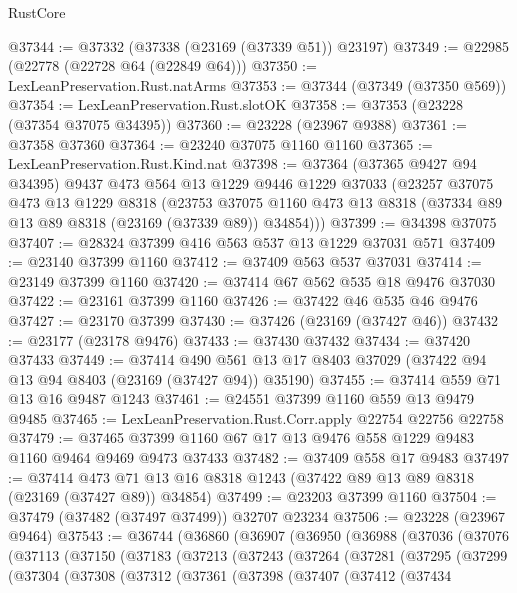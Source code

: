 \begin{lexlean}{RustCore}
\begin{coremodule}
@37344 := @37332 (@37338 (@23169 (@37339 @51)) @23197)
@37349 := @22985 (@22778 (@22728 @64 (@22849 @64)))
@37350 := LexLeanPreservation.Rust.natArms
@37353 := @37344 (@37349 (@37350 @569))
@37354 := LexLeanPreservation.Rust.slotOK
@37358 := @37353 (@23228 (@37354 @37075 @34395))
@37360 := @23228 (@23967 @9388)
@37361 := @37358 @37360
@37364 := @23240 @37075 @1160 @1160
@37365 := LexLeanPreservation.Rust.Kind.nat
@37398 := @37364
    (@37365 @9427 @94 @34395)
    @9437
    @473
    @564
    @13
    @1229
    @9446
    @1229
    @37033
    (@23257
      @37075
      @473
      @13
      @1229
      @8318
      (@23753 @37075 @1160 @473 @13 @8318 (@37334 @89 @13 @89 @8318 (@23169 (@37339 @89)) @34854)))
@37399 := @34398 @37075
@37407 := @28324 @37399 @416 @563 @537 @13 @1229 @37031 @571
@37409 := @23140 @37399 @1160
@37412 := @37409 @563 @537 @37031
@37414 := @23149 @37399 @1160
@37420 := @37414 @67 @562 @535 @18 @9476 @37030
@37422 := @23161 @37399 @1160
@37426 := @37422 @46 @535 @46 @9476
@37427 := @23170 @37399
@37430 := @37426 (@23169 (@37427 @46))
@37432 := @23177 (@23178 @9476)
@37433 := @37430 @37432
@37434 := @37420 @37433
@37449 := @37414
    @490
    @561
    @13
    @17
    @8403
    @37029
    (@37422 @94 @13 @94 @8403 (@23169 (@37427 @94)) @35190)
@37455 := @37414 @559 @71 @13 @16 @9487 @1243
@37461 := @24551 @37399 @1160 @559 @13 @9479 @9485
@37465 := LexLeanPreservation.Rust.Corr.apply @22754 @22756 @22758
@37479 := @37465 @37399 @1160 @67 @17 @13 @9476 @558 @1229 @9483 @1160 @9464 @9469 @9473 @37433
@37482 := @37409 @558 @17 @9483
@37497 := @37414
    @473
    @71
    @13
    @16
    @8318
    @1243
    (@37422 @89 @13 @89 @8318 (@23169 (@37427 @89)) @34854)
@37499 := @23203 @37399 @1160
@37504 := @37479 (@37482 (@37497 @37499)) @32707 @23234
@37506 := @23228 (@23967 @9464)
@37543 := @36744
    (@36860
      (@36907
        (@36950
          (@36988
            (@37036
              (@37076
                (@37113
                  (@37150
                    (@37183
                      (@37213
                        (@37243
                          (@37264
                            (@37281
                              (@37295
                                (@37299
                                  (@37304
                                    (@37308
                                      (@37312
                                        (@37361
                                          (@37398
                                            (@37407
                                              (@37412
                                                (@37434

\end{coremodule}
\end{lexlean}
